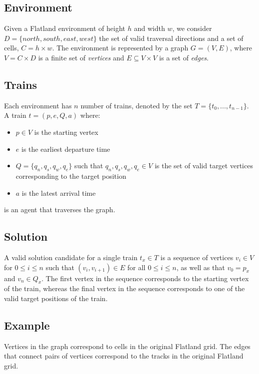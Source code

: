 \subsection{Environment}\label{sec:environment}
Given a Flatland environment of height $h$ and width $w$, we consider $D = \{north,south,east,west\}$ the set of valid traversal directions and a set of cells, $C = h \times w$.  
The environment is represented by a graph $G = (V,E)$, where $V = C \times D$ is a finite set of \textit{vertices} and $E \subseteq V \times V$ is a set of \textit{edges}.


\subsection{Trains}\label{sec:trains}
Each environment has $n$ number of trains, denoted by the set $T = \{t_0,...,t_{n-1}\}$.  A train $t = (p, e, Q, a)$ where:
\begin{itemize}
	\item $p \in V$ is the starting vertex
	\item $e$ is the earliest departure time
	\item $Q = \{q_n, q_s, q_w, q_e\}$ such that $q_n, q_s, q_w, q_e \in V$ is the set of valid target vertices corresponding to the target position
	\item $a$ is the latest arrival time
\end{itemize}

\noindent is an agent that traverses the graph.

\subsection{Solution}\label{sec:solution}
A valid solution candidate for a single train $t_x \in T$ is a sequence of vertices $v_i \in V$ for $0 \leq i \leq n$ such that $(v_i,v_{i+1}) \in E$ for all $0 \leq i \leq n$, as well as that $v_{0} = p_x$ and $v_{n} \in Q_x$.  The first vertex in the sequence corresponds to the starting vertex of the train, whereas the final vertex in the sequence corresponds to one of the valid target positions of the train.


\subsection{Example}\label{sec:example}
Vertices in the graph correspond to cells in the original Flatland grid.  The edges that connect pairs of vertices correspond to the tracks in the original Flatland grid.  


